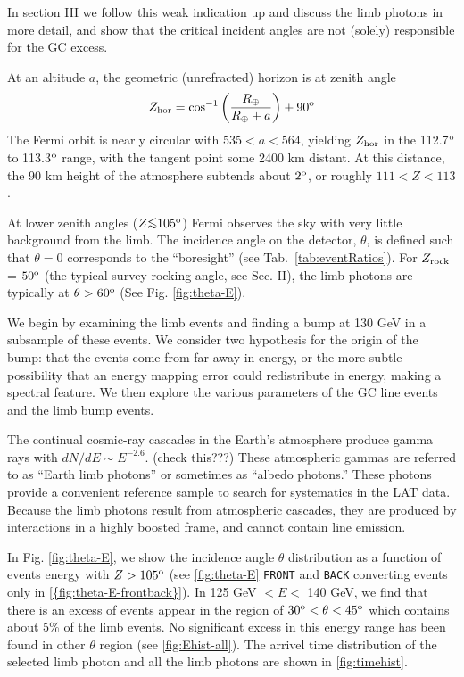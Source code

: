 \documentclass[aps,twocolumn,prd,superscriptaddress,showpacs,nofootinbib,fixfloat]{revtex4}
\newcommand{\be}{\begin{equation}}
\newcommand{\ee}{\end{equation}}
\newcommand{\degree}{^{\rm o}}
\newcommand{\zrock}{$Z_{\rm rock}$}
\def\la{\vcenter{\hbox{$<$}\offinterlineskip\hbox{$\sim$}}}
\begin{document}
In section III we follow this weak indication up and discuss the limb photons
in more detail, and show that the critical incident angles are not (solely)
responsible for the GC excess.

At an altitude $a$, the geometric (unrefracted) horizon is at zenith angle
\be
Z_{\rm hor} = \cos^{-1}\left(\frac{R_\oplus}{R_\oplus+a}\right)+90\degree
\ee
The Fermi orbit is nearly circular with $535 < a < 564$, yielding $Z_{\rm
  hor}$ in the 112.7$\degree$ to 113.3$\degree$ range, with the tangent point
some 2400 km distant.  At this distance, the 90 km height of the atmosphere
subtends about $2\degree$, or roughly $111 < Z < 113$.  

At lower zenith angles ($Z \la 105\degree$) Fermi observes
the sky with very little background from the limb.  The
incidence angle on the detector, $\theta$, is defined such
that $\theta=0$ corresponds to the ``boresight'' (see
Tab.~\ref{tab:eventRatios}).  For \zrock = $50\degree$ (the
typical survey rocking angle, see Sec. II), the limb photons
are typically at $\theta > 60\degree$ (See
Fig. \ref{fig:theta-E}).

We begin by examining the limb events and finding a bump at 130 GeV in a
subsample of these events.  We consider two hypothesis for the origin of the
bump: that the events come from far away in energy, or the more subtle
possibility that an energy mapping error could redistribute in energy, making
a spectral feature.  We then explore the various parameters of the GC line
events and the limb bump events. 

The continual cosmic-ray cascades in the Earth's atmosphere produce gamma rays
with $dN/dE \sim E^{-2.6}$.  (check this???)  These atmospheric gammas are
referred to as ``Earth limb photons'' or sometimes as ``albedo photons.''
These photons provide a convenient reference sample to search for systematics
in the LAT data.  Because the limb photons result from atmospheric cascades,
they are produced by interactions in a highly boosted frame, and cannot
contain line emission. 


In Fig. \ref{fig:theta-E}, we show the incidence angle
$\theta$ distribution as a function of events energy with $Z
> 105\degree$ (see \ref{fig:theta-E} \texttt{FRONT} and
\texttt{BACK} converting events only in
\ref{{fig:theta-E-frontback}}). In 125 GeV $< E <$ 140 GeV,
we find that there is an excess of events appear in the
region of $30\degree < \theta < 45\degree$ which contains
about 5\% of the limb events. No significant excess in this
energy range has been found in other $\theta$ region (see
\ref{fig:Ehist-all}). The arrivel time distribution of the
selected limb photon and all the limb photons are shown in
\ref{fig:timehist}.
\end{document}
